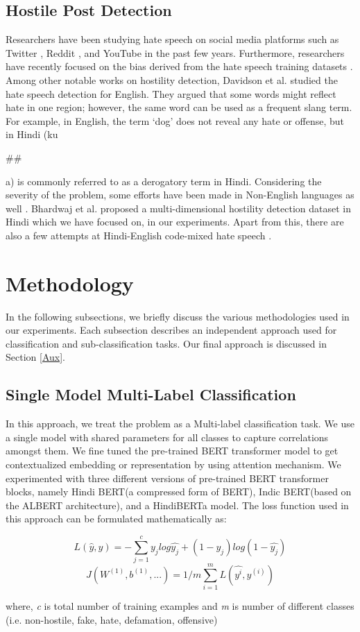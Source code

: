 \documentclass[runningheads]{llncs}
\begin{document}
\subsection*{Hostile Post Detection}Researchers have been studying hate speech on social media platforms such as Twitter \cite{ref_related_work}, Reddit \cite{ref_related_work_2}, and YouTube \cite{ref_related_work_4} in the past few years. Furthermore, researchers have recently focused on the bias derived from the hate speech training datasets \cite{ref_related_work_5}. Among other notable works on hostility detection, Davidson et al. \cite{Davidson} studied the hate speech detection for English. They argued that some words might reflect hate in one region; however, the same word can be used as a frequent slang term. For example, in English, the term ‘dog’ does not reveal any hate or offense, but in Hindi (ku\begin{small}\#\#\end{small}a) is commonly referred to as a derogatory term in Hindi. Considering the severity of the problem, some efforts have been made in Non-English languages as well \cite{ref_german,ref_arabic,ref_bangla,safi-samghabadi-etal-2020-aggression}. Bhardwaj et al. \cite{bhardwaj2020hostility} proposed a multi-dimensional hostility detection dataset in Hindi which we have focused on, in our experiments. Apart from this, there are also a few attempts at Hindi-English code-mixed hate speech \cite{ref_bohra}.

\section{Methodology}
\label{A}
In the following subsections, we briefly discuss the various methodologies used in our experiments. Each subsection describes an independent approach used for classification and sub-classification tasks. Our final approach is discussed in Section \ref{Aux}. 

\subsection{Single Model Multi-Label Classification}
\label{A_2}
{In this approach, we treat the problem as a Multi-label classification task. We use a single model with shared parameters for all classes to capture correlations amongst them. We fine tuned the pre-trained BERT transformer model to get contextualized embedding or representation by using attention mechanism. We experimented with three different versions of pre-trained BERT transformer blocks, namely Hindi BERT(a compressed form of BERT)\cite{HindiBERT}, Indic BERT(based on the ALBERT architecture)\cite{ref_indic_Nlp}, and a HindiBERTa model\cite{HindiBERTa}. The loss function used in this approach can be formulated mathematically as:

\[L(\hat{y},y) = - \sum_{j=1}^{c}y_{j}log\hat{y_j} + (1 - y_j)log(1-\hat{y_j})\]
\[J(W^{(1)}, b^{(1)}, ...) = 1/m \sum_{i = 1}^{m} L(\hat{y^{i}}, y^{(i)})\]

where, \textit{c} is total number of training examples 
and \textit{m} is number of different classes (i.e. non-hostile, fake, hate, defamation, offensive)
}
\end{document}

